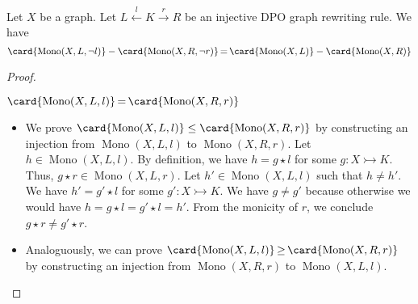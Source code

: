     \begin{lemma}
        \label{lem:xlnlmxrnr}
        Let $X$ be a graph. Let $L \overset{l}{\leftarrow} K \overset{r}{\rightarrow} R$ be an injective DPO graph rewriting rule. We have 
        \[
            \card{\operatorname{Mono}(X, L, \lnot l)}  - \card{\operatorname{Mono}(X, R, \lnot r)} 
            \mathop{=} 
            \card{\operatorname{Mono}(X, L)}  - \card{\operatorname{Mono}(X, R)} 
        \]
    \end{lemma}
    \begin{proof}
        \label{proof:lem:xlnlmxrnr}
        
        \begin{claim}
           $\card{\operatorname{Mono}(X, L, l)} \mathop{=} \card{\operatorname{Mono}(X, R, r)}$
        \end{claim}
        \begin{itemize}
            \item We prove $\card{\operatorname{Mono}(X, L, l)} \leq \card{\operatorname{Mono}(X, R, r)}$ by constructing an injection from $\operatorname{Mono}(X, L, l)$ to $\operatorname{Mono}(X, R, r)$. Let $h \mathop{\in} \operatorname{Mono}(X, L, l)$. By definition, we have $h \mathop{=} g \mathop{\star} l$ for some $g: X \rightarrowtail K$. Thus, $g \mathop{\star} r \mathop{\in} \operatorname{Mono}(X, L, r)$. Let $h' \mathop{\in} \operatorname{Mono}(X, L, l)$ such that $h \mathop{\neq} h'$. We have $h' \mathop{=} g' \mathop{\star} l$ for some $g':X \rightarrowtail K$. We have $g \mathop{\neq} g'$ because otherwise we would have $h \mathop{=} g \mathop{\star} l \mathop{=} g' \mathop{\star} l \mathop{=} h'$. From the monicity of $r$, we conclude $g \mathop{\star} r \mathop{\neq} g' \mathop{\star} r$.
            \item Analoguously, we can prove $\card{\operatorname{Mono}(X, L, l)} \mathop{\geq} \card{\operatorname{Mono}(X, R, r)}$ by constructing an injection from $\operatorname{Mono}(X, R, r)$ to $\operatorname{Mono}(X, L, l)$.

\end{itemize}
\end{proof}
